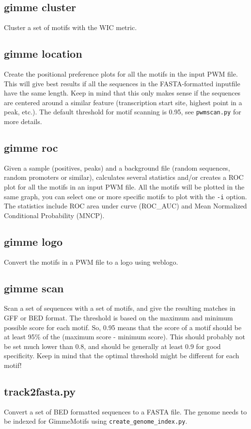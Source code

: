 \documentclass[11pt]{article}
\begin{document}
\subsection*{gimme cluster}
Cluster a set of motifs with the WIC metric.

\subsection*{gimme location}
Create the positional preference plots for all the motifs in the input PWM file. This will give best results if all the sequences in the FASTA-formatted inputfile have the same length. Keep in mind that this only makes sense if the sequences are centered around a similar feature (transcription start site, highest point in a peak, etc.). The default threshold for motif scanning is 0.95, see \texttt{pwmscan.py} for more details.

\subsection*{gimme roc}
Given a sample (positives, peaks) and a background file (random sequences, random promoters or similar), calculates several statistics and/or creates a ROC plot for all the motifs in an input PWM file. All the motifs will be plotted in the same graph, you can select one or more specific motifs to plot with the \texttt{-i} option. The statistics include ROC area under curve (ROC\_AUC) and Mean Normalized Conditional Probability (MNCP).

\subsection*{gimme logo}
Convert the motifs in a PWM file to a logo using weblogo.

\subsection*{gimme scan}
Scan a set of sequences with a set of motifs, and give the resulting matches in GFF or BED format. The threshold is based on the maximum and minimum possible score for each motif. So, 0.95 means that the score of a motif should be at least 95\% of the (maximum score - minimum score). This should probably not be set much lower than 0.8, and should be generally at least 0.9 for good specificity. Keep in mind that the optimal threshold might be different for each motif!

\subsection*{track2fasta.py }
Convert a set of BED formatted sequences to a FASTA file. The genome needs to be indexed for GimmeMotifs using \texttt{create\_genome\_index.py}.
\end{document}

